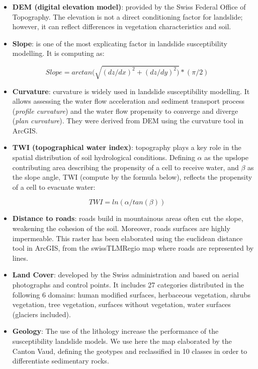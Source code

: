 \documentclass[
]{book}
\begin{document}
\begin{itemize}
\item
  \textbf{DEM (digital elevation model)}: provided by the Swiss Federal Office of Topography.
  The elevation is not a direct conditioning factor for landslide; however, it can reflect differences in vegetation characteristics and soil.
\item
  \textbf{Slope}: is one of the most explicating factor in landslide susceptibility modelling.
  It is computing as:
\end{itemize}

\[Slope = arctan(\sqrt{(dz/dx)^2 + (dz/dy)^2)} * (\pi/2)\]

\begin{itemize}
\item
  \textbf{Curvature}: curvature is widely used in landslide susceptibility modelling.
  It allows assessing the water flow acceleration and sediment transport process (\emph{profile curvature}) and the water flow propensity to converge and diverge (\emph{plan curvature}).
  They were derived from DEM using the curvature tool in ArcGIS.
\item
  \textbf{TWI (topographical water index)}: topography plays a key role in the spatial distribution of soil hydrological conditions.
  Defining \(\alpha\) as the upslope contributing area describing the propensity of a cell to receive water, and \(\beta\) as the slope angle, TWI (compute by the formula below), reflects the propensity of a cell to evacuate water:
\end{itemize}

\[TWI=ln(\alpha/tan(\beta))\]

\begin{itemize}
\item
  \textbf{Distance to roads}: roads build in mountainous areas often cut the slope, weakening the cohesion of the soil.
  Moreover, roads surfaces are highly impermeable.
  This raster has been elaborated using the euclidean distance tool in ArcGIS, from the swissTLMRegio map where roads are represented by lines.
\item
  \textbf{Land Cover}: developed by the Swiss administration and based on aerial photographs and control points.
  It includes 27 categories distributed in the following 6 domains: human modified surfaces, herbaceous vegetation, shrubs vegetation, tree vegetation, surfaces without vegetation, water surfaces (glaciers included).
\item
  \textbf{Geology}: The use of the lithology increase the performance of the susceptibility landslide models.
  We use here the map elaborated by the Canton Vaud, defining the geotypes and reclassified in 10 classes in order to differentiate sedimentary rocks.
\end{itemize}
\end{document}

